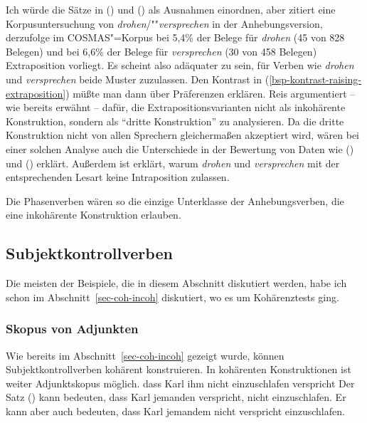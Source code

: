 \noindent
Ich würde die Sätze in () und () als Ausnahmen einordnen, aber \citet{Reis2005a} 
zitiert eine Korpusuntersuchung von \emph{drohen}/""\emph{versprechen} in der Anhebungsversion,
derzufolge im COSMAS"=Korpus bei 5,4\% der Belege für \emph{drohen} (45 von 828 Belegen)
und bei 6,6\% der Belege für \emph{versprechen} (30 von 458 Belegen) Extraposition vorliegt.
Es scheint also adäquater zu sein, für Verben wie \emph{drohen} und \emph{versprechen} 
beide Muster zuzulassen. Den Kontrast in (\ref{bsp-kontrast-raising-extraposition}) müßte man dann über Präferenzen erklären.
Reis argumentiert -- wie bereits erwähnt -- dafür, die Extrapositionsvarianten 
nicht als inkohärente Konstruktion, sondern als "`dritte Konstruktion"' zu analysieren. Da die
dritte Konstruktion nicht von allen Sprechern gleichermaßen akzeptiert wird, wären bei
einer solchen Analyse auch die Unterschiede in der Bewertung von Daten wie () und ()
erklärt. Außerdem ist erklärt, warum \emph{drohen} und \emph{versprechen} mit der entsprechenden Lesart
keine Intraposition zulassen.%

Die Phasenverben wären so die einzige Unterklasse der Anhebungsverben,
die eine inkohärente Konstruktion erlauben.

\subsection{Subjektkontrollverben}

Die meisten der Beispiele, die in diesem Abschnitt diskutiert werden, habe
ich schon im Abschnitt~\ref{sec-coh-incoh} diskutiert, wo es um Kohärenztests ging.


\subsubsection{Skopus von Adjunkten}
\label{sec-subj-contr-scope}

Wie bereits im Abschnitt~\ref{sec-coh-incoh} gezeigt wurde, können Subjektkontrollverben
kohärent konstruieren.
In kohärenten Konstruktionen ist weiter Adjunktskopus möglich.
\ea{}
dass Karl ihm nicht einzuschlafen verspricht
\z
%
Der Satz () kann bedeuten, dass Karl jemanden verspricht, nicht einzuschlafen. Er kann aber
auch bedeuten, dass Karl jemandem nicht verspricht einzuschlafen.


